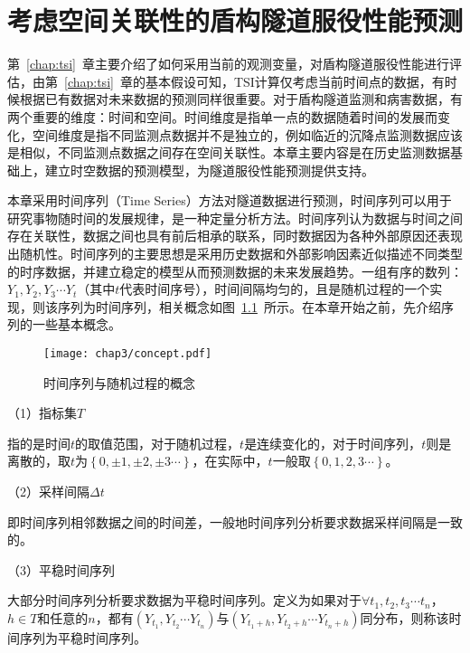 \chapter{考虑空间关联性的盾构隧道服役性能预测}
\label{chap:prediction}

第~\ref{chap:tsi}~章主要介绍了如何采用当前的观测变量，对盾构隧道服役性能进行评估，由第~\ref{chap:tsi}~章的基本假设可知，TSI计算仅考虑当前时间点的数据，有时候根据已有数据对未来数据的预测同样很重要。对于盾构隧道监测和病害数据，有两个重要的维度：时间和空间。时间维度是指单一点的数据随着时间的发展而变化，空间维度是指不同监测点数据并不是独立的，例如临近的沉降点监测数据应该是相似，不同监测点数据之间存在空间关联性。本章主要内容是在历史监测数据基础上，建立时空数据的预测模型，为隧道服役性能预测提供支持。

本章采用时间序列（Time Series）方法对隧道数据进行预测，时间序列可以用于研究事物随时间的发展规律，是一种定量分析方法。时间序列认为数据与时间之间存在关联性，数据之间也具有前后相承的联系，同时数据因为各种外部原因还表现出随机性。时间序列的主要思想是采用历史数据和外部影响因素近似描述不同类型的时序数据，并建立稳定的模型从而预测数据的未来发展趋势。一组有序的数列：${{Y}_{1}},{{Y}_{2}},{{Y}_{3}}\cdots {{Y}_{t}}$（其中$t$代表时间序号），时间间隔均匀的，且是随机过程的一个实现，则该序列为时间序列，相关概念如图~\ref{fig:时间序列与随机过程的概念}~所示。在本章开始之前，先介绍序列的一些基本概念。

\begin{figure}[htb!]
    \centering
    \texttt{[image: chap3/concept.pdf]}
    \caption{时间序列与随机过程的概念}
    \label{fig:时间序列与随机过程的概念}
\end{figure}

（1）指标集$T$

指的是时间$t$的取值范围，对于随机过程，$t$是连续变化的，对于时间序列，$t$则是离散的，取$t$为$\left\{ 0,\pm 1,\pm 2,\pm 3\cdots  \right\}$，在实际中，$t$一般取$\left\{ 0,1,2,3\cdots  \right\}$。

（2）采样间隔$\Delta t$

即时间序列相邻数据之间的时间差，一般地时间序列分析要求数据采样间隔是一致的。

（3）平稳时间序列

大部分时间序列分析要求数据为平稳时间序列。定义为如果对于$\forall {{t}_{1}},{{t}_{2}},{{t}_{3}}\cdots {{t}_{n}}$，$h\in T$和任意的$n$，都有$\left( {{Y}_{{{t}_{1}}}},{{Y}_{{{t}_{2}}}}\cdots {{Y}_{{{t}_{n}}}} \right)$与$\left( {{Y}_{{{t}_{1}}+h}},{{Y}_{{{t}_{2}}+h}}\cdots {{Y}_{{{t}_{n}}+h}} \right)$同分布，则称该时间序列为平稳时间序列。

